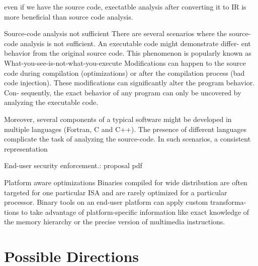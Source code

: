 \documentclass[mathserif,10pt]{beamer}
\begin{document}
{{  even if we have the source code, exectatble analysis after 
  converting it to IR is more beneficial than source code analysis.

  Source-code analysis not sufficient
    There are several scenarios where the source-code analysis is not
    sufficient.  An executable code might demonstrate differ- ent behavior from
    the original source code. This phenomenon is popularly known as
    What-you-see-is-not-what-you-execute 
    Modifications can happen to the source code during compilation
    (optimizations) or after the compilation process (bad code injection).
    These modifications can significantly alter the program behavior. Con-
    sequently, the exact behavior of any program can only be uncovered by
    analyzing the executable code.

    Moreover, several components of a typical software might be developed in
    multiple languages (Fortran, C and C++). The presence of different
    languages complicate the task of analyzing the source-code. In such
    scenarios, a consistent representation

  End-user security enforcement.: proposal pdf

  Platform aware optimizations
    Binaries compiled for wide distribution are often targeted for one
    particular ISA and are rarely optimized for a particular processor.  Binary
    tools on an end-user platform can apply custom transforma- tions to take
    advantage of platform-specific information like exact knowledge of the
    memory hierarchy or the precise version of multimedia instructions.
  
  }
}

\section{Possible Directions}
\end{document}
